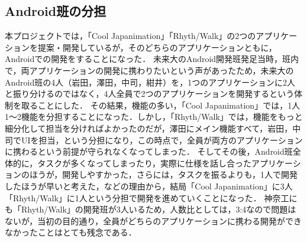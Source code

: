 \subsection{Android班の分担}
\par
本プロジェクトでは，「Cool Japanimation」「Rhyth/Walk」の2つのアプリケーションを提案・開発しているが，そのどちらのアプリケーションともに，Androidでの開発をすることになった．
未来大のAndroid開発班発足当時，班内で，両アプリケーションの開発に携わりたいという声があったため，未来大のAndroid班の4人（岩田，澤田，中司，紺井）を，1つのアプリケーションに2人と振り分けるのではなく，4人全員で2つのアプリケーションを開発するという体制を取ることにした．
その結果，機能の多い，「Cool Japanimation」では，1人1～2機能を分担することになった．しかし，「Rhyth/Walk」では，機能をもっと細分化して担当を分ければよかったのだが，澤田にメイン機能すべて，岩田，中司でUIを担当，という分担になり，この時点で，全員が両方のアプリケーションに携わるという前提が守られなくなってしまった．
そしてその後，Android班全体的に，タスクが多くなってしまったり，実際に仕様を話し合ったアプリケーションのほうが，開発しやすかった，さらには，タスクを振るよりも，1人で開発したほうが早いと考えた，などの理由から，結局「Cool Japanimation」に3人「Rhyth/Walk」に1人という分担で開発を進めていくことになった．
神奈工にも「Rhyth/Walk」の開発班が3人いるため，人数比としては，3:4なので問題はないが，当初の目的通り，全員がどちらのアプリケーションに携わる開発ができなかったことはとても残念である．
